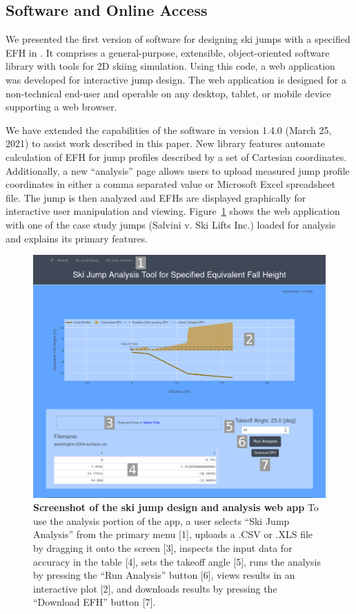 \documentclass{article}
\begin{document}
\subsection{Software and Online Access}
\label{sec:software}
%
We presented the first version of software for designing ski jumps with a
specified EFH in \cite{Moore2018}. It comprises a general-purpose, extensible,
object-oriented software library with tools for 2D skiing simulation. Using
this code, a web application was developed for interactive jump design. The web
application is designed for a non-technical end-user and operable on any
desktop, tablet, or mobile device supporting a web browser.

We have extended the capabilities of the software in version 1.4.0 (March 25,
2021) to assist work described in this paper. New library features automate
calculation of EFH for jump profiles described by a set of Cartesian
coordinates. Additionally, a new ``analysis'' page allows users to upload
measured jump profile coordinates in either a comma separated value or
Microsoft Excel spreadsheet file. The jump is then analyzed and EFHs are
displayed graphically for interactive user manipulation and viewing.
Figure~\ref{fig:web-app-screenshot} shows the web application with one of the
case study jumps (Salvini v. Ski Lifts Inc.) loaded for analysis and explains
its primary features.
%
\begin{figure}
  \centering
  \includegraphics[width=\columnwidth]{figures/web-app-screenshot.png}
  \caption{\textbf{Screenshot of the ski jump design and analysis web app} To
    use the analysis portion of the app, a user selects ``Ski Jump Analysis''
    from the primary menu [1], uploads a .CSV or .XLS file by dragging it onto
    the screen [3], inspects the input data for accuracy in the table [4], sets
    the takeoff angle [5], runs the analysis by pressing the ``Run Analysis''
    button [6], views results in an interactive plot [2], and downloads
     results by pressing the ``Download EFH'' button [7].}
  \label{fig:web-app-screenshot}
\end{figure}
\end{document}
